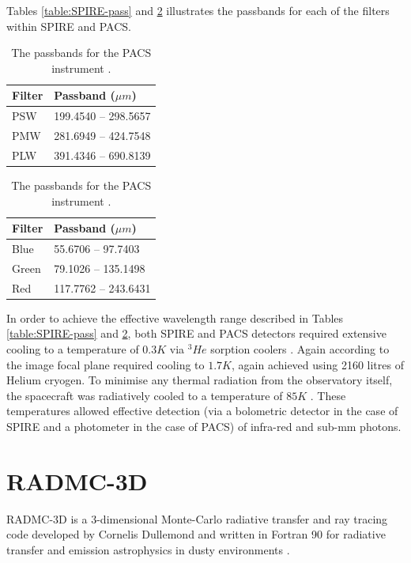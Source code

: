 \documentclass{report}
\begin{document}
Tables \ref{table:SPIRE-pass} and \ref{table:PACS-pass} illustrates the passbands for each of the filters within SPIRE and PACS.

\begin{table}[h]
  \parbox{.4\linewidth}{
  \centering
  \begin{tabular}{||l l||}
  \hline
  Filter & Passband ($\mu m$) \\ [0.5ex]
  \hline\hline
  PSW    &    199.4540 --	298.5657   \\
  \hline
  PMW    &    281.6949 --	424.7548   \\
  \hline
  PLW    &    391.4346 --	690.8139   \\ [1ex]
  \hline
  \end{tabular}
  \caption{The passbands (for extended source) for the SPIRE instrument \parencite{pass}.}
  \label{table:SPIRE-pass}
  }
  \parbox{.4\linewidth}{
  \centering
  \begin{tabular}{||l l||}
  \hline
  Filter & Passband ($\mu m$) \\ [0.5ex]
  \hline\hline
  Blue   &    55.6706 -- 97.7403       \\
  \hline
  Green  &    79.1026 --	135.1498     \\
  \hline
  Red    &    117.7762 --	243.6431     \\ [1ex]
  \hline
  \end{tabular}
  \caption{The passbands for the PACS instrument \parencite{pass}.}
  \label{table:PACS-pass}
  }
\end{table}

In order to achieve the effective wavelength range described in Tables \ref{table:SPIRE-pass} and \ref{table:PACS-pass}, both SPIRE and PACS detectors required extensive cooling to a temperature of $0.3 K$ via $^{3}{He}$ sorption coolers \parencite{herschel}. Again according to \textcite{herschel} the image focal plane required cooling to $1.7 K$, again achieved using 2160 litres of Helium cryogen. To minimise any thermal radiation from the observatory itself, the spacecraft was radiatively cooled to a temperature of $85 K$ \parencite{herschel}. These temperatures allowed effective detection (via a bolometric detector in the case of SPIRE and a photometer in the case of PACS) of infra-red and sub-mm photons.

\section{RADMC-3D} \label{radmc}
RADMC-3D is a 3-dimensional Monte-Carlo radiative transfer and ray tracing code developed by Cornelis Dullemond and written in Fortran 90 for radiative transfer and emission astrophysics in dusty environments \parencite{RADMC-3D}.
\end{document}
